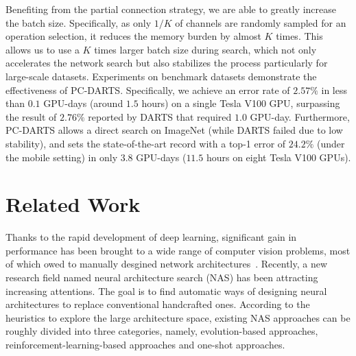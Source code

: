 \documentclass{article} \usepackage{iclr2020_conference,times}
\begin{document}
Benefiting from the partial connection strategy, we are able to greatly increase the batch size. Specifically, as only $1/K$ of channels are  randomly sampled for an operation selection, it reduces the memory burden by almost $K$ times. This allows us to use a $K$ times larger batch size during search, which not only accelerates the network search but also stabilizes the process particularly for large-scale datasets. Experiments on benchmark datasets  demonstrate the effectiveness of PC-DARTS. Specifically, we achieve an error rate of $2.57\%$ in less than $0.1$ GPU-days (around $1.5$ hours) on a single Tesla V100 GPU, surpassing the result of $2.76\%$ reported by DARTS that required $1.0$ GPU-day. Furthermore, PC-DARTS allows a direct search on ImageNet (while DARTS failed due to low stability), and sets the state-of-the-art record with a top-1 error of $24.2\%$ (under the mobile setting) in only $3.8$ GPU-days ($11.5$ hours on eight Tesla V100 GPUs).







\section{Related Work}
\label{RelatedWork}

Thanks to the rapid development of deep learning, significant gain in performance has been brought to a wide range of computer vision problems, most of which owed to manually desgined network architectures~\citep{krizhevsky2012imagenet,simonyan2014very,he2016deep,huang2017densely}. Recently, a new research field named neural architecture search (NAS) has been attracting increasing attentions. The goal is to find automatic ways of designing neural architectures to replace conventional handcrafted ones. According to the heuristics to explore the large architecture space, existing NAS approaches can be roughly divided into three categories, namely, evolution-based approaches, reinforcement-learning-based approaches and one-shot approaches.
\end{document}
